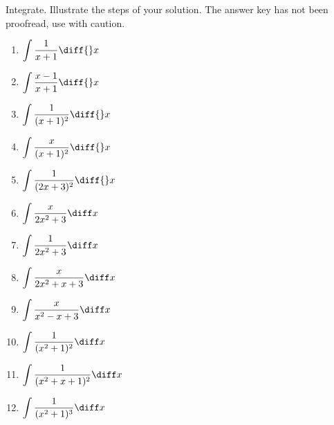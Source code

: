Integrate. Illustrate the steps of your solution. The answer key has not been proofread, use with caution.
\begin{multicols}{2}
\begin{enumerate}
\item $\displaystyle \int \frac{1}{x+1}\diff {}x$
\item $\displaystyle \int \frac{x-1}{x+1}\diff {}x$


\item $\displaystyle \int \frac{1}{(x+1)^2}\diff {}x$


\item $\displaystyle \int \frac{x}{(x+1)^2}\diff {}x$


\item $\displaystyle \int \frac{1}{(2x+3)^2}\diff {}x$

\item $\displaystyle
\int \frac{x}{ 2x^2+3}\diff x
$
\item $\displaystyle
\int \frac{1}{ 2x^2+3}\diff x
$

\item $\displaystyle
\int \frac{x}{ 2x^2+x+3}\diff x
$
\item $\displaystyle
\int \frac{x}{ x^2-x+3}\diff x
$
\item $\displaystyle
\int \frac{1}{ (x^2+1)^2}\diff x
$
\item $\displaystyle
\int \frac{1}{ (x^2+x+1)^2}\diff x
$
\item $\displaystyle
\int \frac{1}{ (x^2+1)^3}\diff x
$
\end{enumerate}
\end{multicols}
